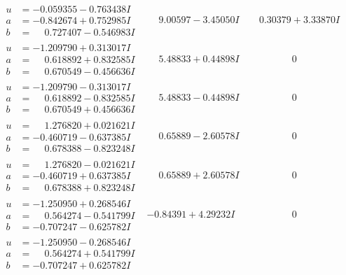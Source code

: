 \documentclass[1p]{elsarticle_modified}
\theoremstyle{definition}
\begin{document}
$$\begin{array}{c|c|c}
\begin{aligned}
u &= -0.059355 - 0.763438 I \\
a &= -0.842674 + 0.752985 I \\
b &= \phantom{-}0.727407 - 0.546983 I\end{aligned}
 & \phantom{-}9.00597 - 3.45050 I & \phantom{-}0.30379 + 3.33870 I \\ \hline\begin{aligned}
u &= -1.209790 + 0.313017 I \\
a &= \phantom{-}0.618892 + 0.832585 I \\
b &= \phantom{-}0.670549 - 0.456636 I\end{aligned}
 & \phantom{-}5.48833 + 0.44898 I & \phantom{-0.000000 } 0 \\ \hline\begin{aligned}
u &= -1.209790 - 0.313017 I \\
a &= \phantom{-}0.618892 - 0.832585 I \\
b &= \phantom{-}0.670549 + 0.456636 I\end{aligned}
 & \phantom{-}5.48833 - 0.44898 I & \phantom{-0.000000 } 0 \\ \hline\begin{aligned}
u &= \phantom{-}1.276820 + 0.021621 I \\
a &= -0.460719 - 0.637385 I \\
b &= \phantom{-}0.678388 - 0.823248 I\end{aligned}
 & \phantom{-}0.65889 - 2.60578 I & \phantom{-0.000000 } 0 \\ \hline\begin{aligned}
u &= \phantom{-}1.276820 - 0.021621 I \\
a &= -0.460719 + 0.637385 I \\
b &= \phantom{-}0.678388 + 0.823248 I\end{aligned}
 & \phantom{-}0.65889 + 2.60578 I & \phantom{-0.000000 } 0 \\ \hline\begin{aligned}
u &= -1.250950 + 0.268546 I \\
a &= \phantom{-}0.564274 - 0.541799 I \\
b &= -0.707247 - 0.625782 I\end{aligned}
 & -0.84391 + 4.29232 I & \phantom{-0.000000 } 0 \\ \hline\begin{aligned}
u &= -1.250950 - 0.268546 I \\
a &= \phantom{-}0.564274 + 0.541799 I \\
b &= -0.707247 + 0.625782 I\end{aligned}

\end{array}$$
\end{document}
